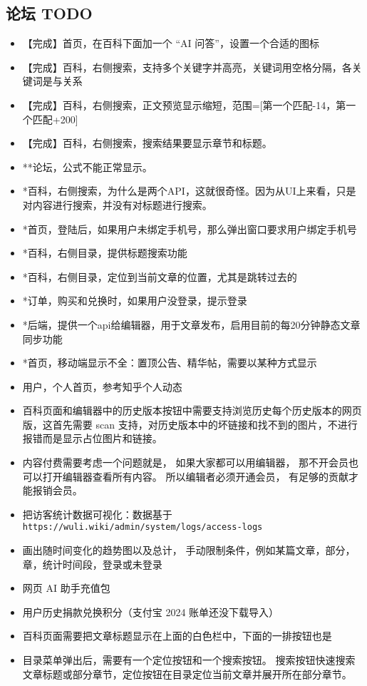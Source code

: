 \subsection{论坛 TODO}\label{sub_edTODO_4}
\begin{itemize}
\item 【完成】首页，在百科下面加一个 “AI 问答”，设置一个合适的图标
\item 【完成】百科，右侧搜索，支持多个关键字并高亮，关键词用空格分隔，各关键词是与关系
\item 【完成】百科，右侧搜索，正文预览显示缩短，范围=[第一个匹配-14，第一个匹配+200]
\item 【完成】百科，右侧搜索，搜索结果要显示章节和标题。
\item **论坛，公式不能正常显示。
\item *百科，右侧搜索，为什么是两个API，这就很奇怪。因为从UI上来看，只是对内容进行搜索，并没有对标题进行搜索。
\item *首页，登陆后，如果用户未绑定手机号，那么弹出窗口要求用户绑定手机号
\item *百科，右侧目录，提供标题搜索功能
\item *百科，右侧目录，定位到当前文章的位置，尤其是跳转过去的
\item *订单，购买和兑换时，如果用户没登录，提示登录
\item *后端，提供一个api给编辑器，用于文章发布，启用目前的每20分钟静态文章同步功能
\item *首页，移动端显示不全：置顶公告、精华帖，需要以某种方式显示
\item 用户，个人首页，参考知乎个人动态
\item 百科页面和编辑器中的历史版本按钮中需要支持浏览历史每个历史版本的网页版，这首先需要 scan 支持，对历史版本中的坏链接和找不到的图片，不进行报错而是显示占位图片和链接。
\item 内容付费需要考虑一个问题就是， 如果大家都可以用编辑器， 那不开会员也可以打开编辑器查看所有内容。 所以编辑者必须开通会员， 有足够的贡献才能报销会员。
\item 把访客统计数据可视化：数据基于 \verb`https://wuli.wiki/admin/system/logs/access-logs`
\item 画出随时间变化的趋势图以及总计， 手动限制条件，例如某篇文章，部分，章，统计时间段，登录或未登录
\item 网页 AI 助手充值包
\item 用户历史捐款兑换积分（支付宝 2024 账单还没下载导入）
\item 百科页面需要把文章标题显示在上面的白色栏中，下面的一排按钮也是
\item 目录菜单弹出后，需要有一个定位按钮和一个搜索按钮。 搜索按钮快速搜索文章标题或部分章节，定位按钮在目录定位当前文章并展开所在部分章节。
\end{itemize}


